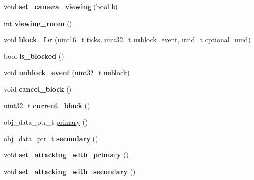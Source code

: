 \begin{DoxyCompactItemize}
\mbox{\label{classmods_1_1player_ab281ba48de0f14bab911f9804137b659}} 
void {\bfseries set\+\_\+camera\+\_\+viewing} (bool b)
\item 
\mbox{\label{classmods_1_1player_a72a0ca876e17e3802c39b48b84bfecf1}} 
int {\bfseries viewing\+\_\+room} ()
\item 
\mbox{\label{classmods_1_1player_a3835ab002b5095a596f421c262c6eac8}} 
void {\bfseries block\+\_\+for} (uint16\+\_\+t ticks, uint32\+\_\+t unblock\+\_\+event, uuid\+\_\+t optional\+\_\+uuid)
\item 
\mbox{\label{classmods_1_1player_a1fd569b4507c1e9beefea643672f7fb9}} 
bool {\bfseries is\+\_\+blocked} ()
\item 
\mbox{\label{classmods_1_1player_a5f0433a04d22c54caf333c7fd4aadf4c}} 
void {\bfseries unblock\+\_\+event} (uint32\+\_\+t unblock)
\item 
\mbox{\label{classmods_1_1player_a88b940f9690adca6648f0f55bf3e7df8}} 
void {\bfseries cancel\+\_\+block} ()
\item 
\mbox{\label{classmods_1_1player_a50c0e905eb53acc6abc01012704f8a70}} 
uint32\+\_\+t {\bfseries current\+\_\+block} ()
\item 
obj\+\_\+data\+\_\+ptr\+\_\+t \hyperlink{classmods_1_1player_a88891bc28021b56598229c3b8a122ef0}{primary} ()
\item 
\mbox{\label{classmods_1_1player_a118c02387c06c547b4d3c240f172fd18}} 
obj\+\_\+data\+\_\+ptr\+\_\+t {\bfseries secondary} ()
\item 
\mbox{\label{classmods_1_1player_a6153d1ba7a90ccb20804409a322d4288}} 
void {\bfseries set\+\_\+attacking\+\_\+with\+\_\+primary} ()
\item 
\mbox{\label{classmods_1_1player_a067cdcd3ffbb193fb864b5720b8d7e6e}} 
void {\bfseries set\+\_\+attacking\+\_\+with\+\_\+secondary} ()
\item 
\mbox{\label{classmods_1_1player_a012244041a3396dc4ba3dc70092c5ea1}} 

\end{DoxyCompactItemize}
